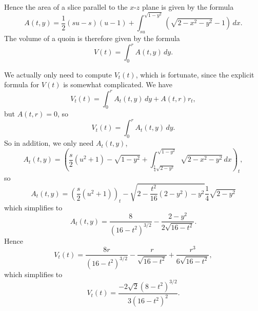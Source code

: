 Hence the area of a slice parallel to the $x$-$z$ plane is given
by the formula
\[
A(t,y) = \frac{1}{2}(s u - s)(u - 1) +
\int_{s u}^{\sqrt{1-y^2}}{(\sqrt{2-x^2-y^2}-1) \,dx}.
\]
The volume of a quoin is therefore given by the formula
\[
V(t) = \int_0^r{A(t,y)\,dy}.
\]

We actually only need to compute $V_t(t)$,
which is fortunate,
since the explicit formula for $V(t)$ is somewhat complicated.
We have
\[
V_t(t) = \int_0^r{A_t(t,y)\,dy} + A(t,r) r_t,
\]
but $A(t,r) = 0$, so
\[
V_t(t) = \int_0^r{A_t(t,y)\,dy}.
\]
So in addition, we only need $A_t(t,y)$,
\[
A_t(t,y) = (\frac{s}{2}(u^2+1) - \sqrt{1-y^2} +
\int_{\frac{t}{4}\sqrt{2-y^2}}^{\sqrt{1-y^2}}{\sqrt{2-x^2-y^2}\,dx})_t,
\]
so
\[
A_t(t,y) = (\frac{s}{2}(u^2+1))_t -
\sqrt{2-\frac{t^2}{16}(2-y^2) - y^2}\frac{1}{4}\sqrt{2-y^2}
\]
which simplifies to
\[
A_t(t,y) = \frac{8}{(16-t^2)^{3/2}} - \frac{2-y^2}{2\sqrt{16-t^2}}.
\]
Hence
\[
V_t(t) = \frac{8r}{(16-t^2)^{3/2}} - \frac{r}{\sqrt{16-t^2}} +
\frac{r^3}{6\sqrt{16-t^2}},
\]
which simplifies to
\[
V_t(t) = \frac{-2\sqrt{2}(8-t^2)^{3/2}}{3(16-t^2)^2}.
\]


